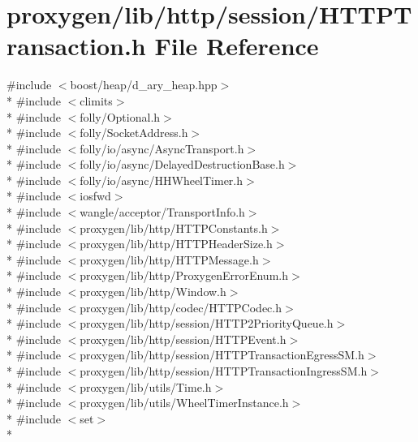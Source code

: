 \section{proxygen/lib/http/session/\+H\+T\+T\+P\+Transaction.h File Reference}
\label{HTTPTransaction_8h}
{\ttfamily \#include $<$boost/heap/d\+\_\+ary\+\_\+heap.\+hpp$>$}\\*
{\ttfamily \#include $<$climits$>$}\\*
{\ttfamily \#include $<$folly/\+Optional.\+h$>$}\\*
{\ttfamily \#include $<$folly/\+Socket\+Address.\+h$>$}\\*
{\ttfamily \#include $<$folly/io/async/\+Async\+Transport.\+h$>$}\\*
{\ttfamily \#include $<$folly/io/async/\+Delayed\+Destruction\+Base.\+h$>$}\\*
{\ttfamily \#include $<$folly/io/async/\+H\+H\+Wheel\+Timer.\+h$>$}\\*
{\ttfamily \#include $<$iosfwd$>$}\\*
{\ttfamily \#include $<$wangle/acceptor/\+Transport\+Info.\+h$>$}\\*
{\ttfamily \#include $<$proxygen/lib/http/\+H\+T\+T\+P\+Constants.\+h$>$}\\*
{\ttfamily \#include $<$proxygen/lib/http/\+H\+T\+T\+P\+Header\+Size.\+h$>$}\\*
{\ttfamily \#include $<$proxygen/lib/http/\+H\+T\+T\+P\+Message.\+h$>$}\\*
{\ttfamily \#include $<$proxygen/lib/http/\+Proxygen\+Error\+Enum.\+h$>$}\\*
{\ttfamily \#include $<$proxygen/lib/http/\+Window.\+h$>$}\\*
{\ttfamily \#include $<$proxygen/lib/http/codec/\+H\+T\+T\+P\+Codec.\+h$>$}\\*
{\ttfamily \#include $<$proxygen/lib/http/session/\+H\+T\+T\+P2\+Priority\+Queue.\+h$>$}\\*
{\ttfamily \#include $<$proxygen/lib/http/session/\+H\+T\+T\+P\+Event.\+h$>$}\\*
{\ttfamily \#include $<$proxygen/lib/http/session/\+H\+T\+T\+P\+Transaction\+Egress\+S\+M.\+h$>$}\\*
{\ttfamily \#include $<$proxygen/lib/http/session/\+H\+T\+T\+P\+Transaction\+Ingress\+S\+M.\+h$>$}\\*
{\ttfamily \#include $<$proxygen/lib/utils/\+Time.\+h$>$}\\*
{\ttfamily \#include $<$proxygen/lib/utils/\+Wheel\+Timer\+Instance.\+h$>$}\\*
{\ttfamily \#include $<$set$>$}\\*
